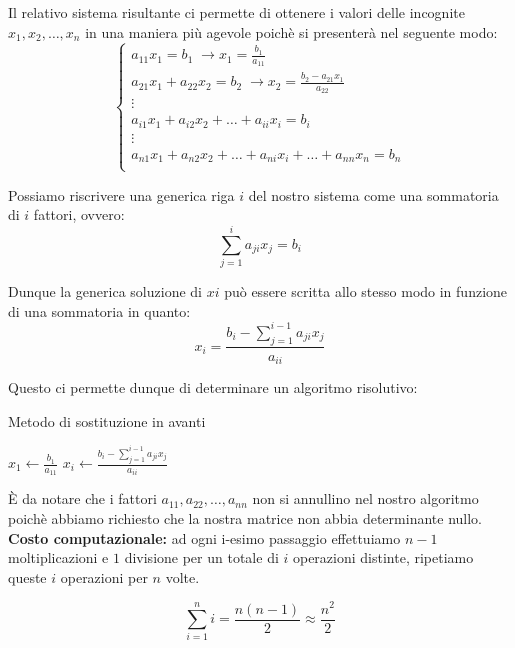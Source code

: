 \documentclass[12pt, a4paper]{book}
\theoremstyle{definition}
\begin{document}
\begin{flushleft}
\begin{enumerate}
	Il relativo sistema risultante ci permette di ottenere i valori delle incognite $x_{1},x_{2}, \dots, x_{n}$ in una maniera più agevole  poichè si presenterà nel seguente modo: 	
	\[ 
		\begin{cases}
  				a_{11}x_{1} = b_{1} \; \longrightarrow x_{1} = \frac{b_{1}}{a_{11}} \\   
       			a_{21}x_{1} + a_{22}x_{2} = b_{2} \; \longrightarrow x_{2} = \frac{b_{2}- a_{21}x_{1}}{a_{22}}  \\
       			\vdots \\
       			a_{i1}x_{1} + a_{i2}x_{2}  + \dots + a_{ii}x_{i} = b_{i} \\
       			\vdots \\
  				a_{n1}x_{1} + a_{n2}x_{2}  + \dots + a_{ni}x_{i} + \dots + a_{nn}x_{n} = b_{n} \\
		\end{cases}	
	\]
	
	Possiamo riscrivere una generica riga $i$ del nostro sistema come una sommatoria di $i$ fattori, ovvero: 
	\[
		\sum_{j = 1} ^ {i} a_{ji}x_{j} = b_{i}
	\]	
	
	Dunque la generica soluzione di $xi$ può essere scritta allo stesso modo in funzione di una sommatoria in quanto:
	\[
		x_{i} = \frac{ b_{i} - \sum_{j = 1} ^ {i-1} a_{ji}x_{j}}{a_{ii}}
	\]	
	
	Questo ci permette dunque di determinare un algoritmo risolutivo: 
	
	\begin{algorithm}
		\caption{ Metodo di sostituzione in avanti}
		\begin{algorithmic} 
			\STATE $ x_{1} \leftarrow  \frac{b_{1}}{a_{11}}$
				\STATE $ x_{i} \leftarrow  \frac{ b_{i} - \sum_{j = 1} ^ {i-1} a_{ji}x_{j}}{a_{ii}} $
			\ENDFOR
		\end{algorithmic}
	\end{algorithm}	
	
	È da notare che i fattori $a_{11}, a_{22}, \dots, a_{nn}$ non si annullino nel nostro algoritmo poichè abbiamo richiesto che la nostra matrice non abbia determinante nullo.\\
\vspace{1em}
\textbf{Costo computazionale:} ad ogni i-esimo passaggio effettuiamo $n-1$ moltiplicazioni e $1$ divisione per un totale di $i$ operazioni distinte,  ripetiamo queste $i$ operazioni per $n$ volte. 

\[
	\sum_{i = 1}^{n} i = \frac{n(n-1)}{2} \approx \frac{n^{2}}{2}
\]


\end{enumerate}
\end{flushleft}
\end{document}
